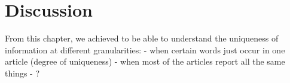 



\section{Discussion}
\label{sec:cgs_findings}

From this chapter, we achieved to be able to understand the uniqueness of information at different granularities:
- when certain words just occur in one article (degree of uniqueness)
- when most of the articles report all the same things
- ?



